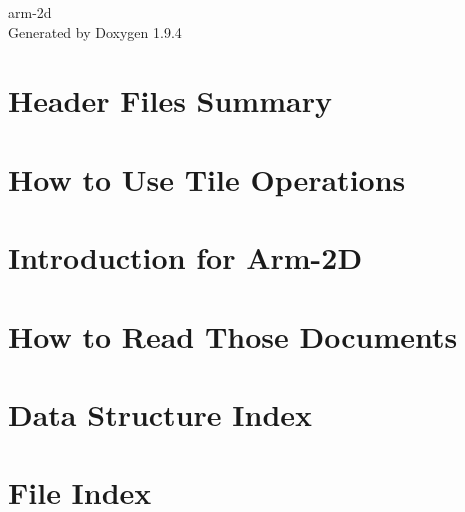 \documentclass[twoside]{book}
\newcommand{\+}{\discretionary{\mbox{\scriptsize$\hookleftarrow$}}{}{}}
\newcommand{\clearemptydoublepage}{%
    \newpage{\pagestyle{empty}\cleardoublepage}%
  }
\begin{document}
  \raggedbottom
    \hypersetup{pageanchor=false,
                bookmarksnumbered=true,
                pdfencoding=unicode
               }
  \begin{titlepage}
  \vspace*{7cm}
  \begin{center}%
  {\Large arm-\/2d}\\
  \vspace*{1cm}
  {\large Generated by Doxygen 1.9.4}\\
  \end{center}
  \end{titlepage}
  \clearemptydoublepage
  \tableofcontents
  \clearemptydoublepage
  \hypersetup{pageanchor=true}
\chapter{Header Files Summary}
\label{md_E__git_EndpointAI_Kernels_Research_Arm_2D_Library_Include_README}

\chapter{How to Use Tile Operations}
\label{md_how_to_use_tile_operations}

\chapter{Introduction for Arm-\/2D}
\label{md_Introduction}

\chapter{How to Read Those Documents}
\label{md_README}

\chapter{Data Structure Index}

\chapter{File Index}

\end{document}
